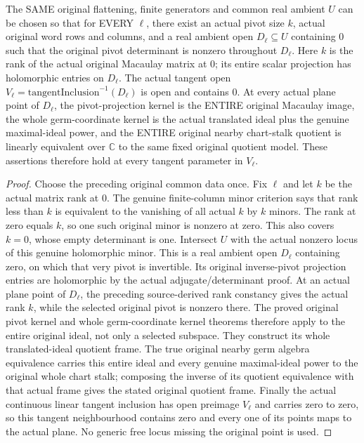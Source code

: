 \begin{theorem}
\label{hir:actual-hs-constant-centre-origin-pivot-whole-frames}
The SAME original flattening, finite generators and common real
ambient $U$ can be chosen so that for EVERY $\ell$, there exist an
actual pivot size $k$, actual original word rows and columns, and a
real ambient open $D_\ell\subseteq U$ containing $0$ such that the
original pivot determinant is nonzero throughout $D_\ell$.
Here $k$ is the rank of the actual original Macaulay matrix at $0$;
its entire scalar projection has holomorphic entries on $D_\ell$.
The actual tangent open $V_\ell=\mathrm{tangentInclusion}^{-1}(D_\ell)$
is open and contains $0$. At every actual plane point of $D_\ell$,
the pivot-projection kernel is the ENTIRE original Macaulay image,
the whole germ-coordinate kernel is the actual translated ideal plus
the genuine maximal-ideal power, and the ENTIRE original nearby
chart-stalk quotient is linearly equivalent over $\mathbb C$ to the
same fixed original quotient model. These assertions therefore hold
at every tangent parameter in $V_\ell$.
\leanok
\end{theorem}
\begin{proof}
Choose the preceding original common data once. Fix $\ell$ and let
$k$ be the actual matrix rank at $0$. The genuine finite-column
minor criterion says that rank less than $k$ is equivalent to the
vanishing of all actual $k$ by $k$ minors. The rank at zero equals
$k$, so one such original minor is nonzero at zero. This also covers
$k=0$, whose empty determinant is one. Intersect $U$ with the actual
nonzero locus of this genuine holomorphic minor. This is a real
ambient open $D_\ell$ containing zero, on which that very pivot is
invertible. Its original inverse-pivot projection entries are
holomorphic by the actual adjugate/determinant proof.
At an actual plane point of $D_\ell$, the preceding source-derived
rank constancy gives the actual rank $k$, while the selected original
pivot is nonzero there. The proved original pivot kernel and whole
germ-coordinate kernel theorems therefore apply to the entire
original ideal, not only a selected subspace. They construct its
whole translated-ideal quotient frame. The true original nearby germ
algebra equivalence carries this entire ideal and every genuine
maximal-ideal power to the original whole chart stalk; composing the
inverse of its quotient equivalence with that actual frame gives the
stated original quotient frame. Finally the actual continuous linear
tangent inclusion has open preimage $V_\ell$ and carries zero to
zero, so this tangent neighbourhood contains zero and every one of
its points maps to the actual plane. No generic free locus missing
the original point is used.
\end{proof}

